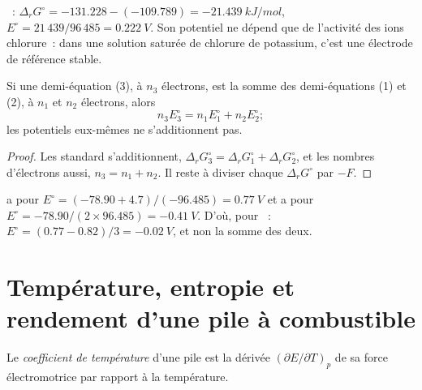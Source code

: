 \begin{example}\label{ex:b2:cell-thermodynamics:agcl}
~: $\Delta_r G^\circ = -131.228 - (-109.789) =
\qty{-21.439}{kJ/mol}$, $E^\circ = 21\,439/96\,485 = \qty{0.222}{V}$. Son potentiel
ne dépend que de l'activité des ions chlorure~: dans une solution saturée de chlorure de
potassium, c'est une électrode de référence stable.
\end{example}

\begin{proposition}\label{prop:b2:cell-thermodynamics:combining}
Si une demi-équation (3), à $n_3$ électrons, est la somme des demi-équations (1)
et (2), à $n_1$ et $n_2$ électrons, alors
\[
  n_3E_3^\circ = n_1E_1^\circ + n_2E_2^\circ ;
\]
les potentiels eux-mêmes ne s'additionnent pas.
\end{proposition}

\begin{proof}
Les  standard s'additionnent, $\Delta_r G_3^\circ = \Delta_r G_1^\circ + \Delta_r
G_2^\circ$, et les nombres d'électrons aussi, $n_3 = n_1 + n_2$. Il reste à diviser chaque $\Delta_r
G^\circ$ par $-F$.
\end{proof}

\begin{example}\label{ex:b2:cell-thermodynamics:iron}
 a pour $E^\circ = (-78.90 + 4.7)/(-96.485) = \qty{0.77}{V}$
et  a pour $E^\circ = -78.90/(2 \times 96.485) =
\qty{-0.41}{V}$. D'où, pour ~: $E^\circ = (0.77 - 0.82)/3 =
\qty{-0.02}{V}$, et non la somme des deux.
\end{example}

\section{Température, entropie et rendement d'une pile à combustible}

\begin{definition}\label{def:b2:cell-thermodynamics:temperature-coefficient}
Le \emph{coefficient de température} d'une pile est
la dérivée $(\partial E/\partial T)_p$ de sa force électromotrice par
rapport à la température.
\end{definition}

